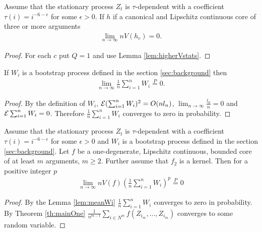 \begin{lemma}
\label{lem:higherVstats2}
Assume that the stationary process $Z_t$ is $\tau$-dependent with a coefficient $\tau(i) = i^{-6-\epsilon}$ for some $\epsilon>0$. If $h$ if a canonical and Lipschitz continuous core of three or more arguments  
\begin{align}
\lim_{n \to \infty} n V(h_c) = 0.
\end{align}
\end{lemma}
\begin{proof}
For each $c$ put $Q=1$ and use Lemma \ref{lem:higherVstats}.
\end{proof}





\begin{lemma}
\label{lem:meanWi}
If $W_i$ is a bootstrap process defined in the section \ref{sec:background} then
\begin{align}
\lim_{n \to \infty} \frac 1 n \sum_{i=1}^n W_i \overset{P}{=} 0.
\end{align}
\end{lemma}
\begin{proof}
By the definition of $W_i$, $\mathcal{E} (\sum_{i=1}^n W_i)^2 = O(n l_n)$,  $\lim_{n \to \infty} \frac {l_n}{n} =0 $ and $\mathcal{E} \sum_{i=1}^n W_i = 0$. Therefore $\frac{1} {n} \sum_{i=1}^{n}W_i$ converges to zero in probability.
\end{proof}





\begin{lemma}
\label{lem:toZeroWi}
Assume that the stationary process $Z_t$ is $\tau$-dependent with a coefficient $\tau(i) = i^{-6-\epsilon}$ for some $\epsilon>0$ and $W_i$ is a bootstrap process defined in the section \ref{sec:background}. Let $f$ be a one-degenerate, Lipschitz continuous, bounded core of at least $m$ arguments, $m \geq 2$. Further assume that $f_2$ is a kernel. Then for a positive integer $p$
\begin{align}
\lim_{n \to \infty } n V(f) \left( \frac 1 n \sum_{i=1}^n W_i \right)^p \overset{P}{=} 0
\end{align}
\end{lemma}

\begin{proof}
By  the Lemma \ref{lem:meanWi} $\frac{1} {n} \sum_{i=1}^{n}W_i$ converges to zero in probability. By Theorem \ref{th:mainOne} $ \frac {1}{n^{m-1}} \sum_{i \in N^m} f(Z_{i_m},...,Z_{i_m}) $ converges to some random variable. 
\end{proof}

